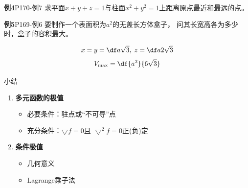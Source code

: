 \begin{frame}
	\linespread{1.2}
	\begin{exampleblock}{{\bf 例4}\hfill P170-例7}
		求平面$x+y+z=1$与柱面$x^2+y^2=1$上距离原点最近和最远的点。\pause 
	\end{exampleblock}
	\begin{center}
	\end{center}
\end{frame}

\begin{frame}
	\linespread{1.2}
	\begin{exampleblock}{{\bf 例5}\hfill P169-例6}
		要制作一个表面积为$a^2$的无盖长方体盒子，
		问其长宽高各为多少时，盒子的容积最大。\pause 
	\end{exampleblock}
	\alert{
	$$x=y=\df a{\sqrt 3},\;z=\df a{2\sqrt3}$$
	$$V_{\max}=\df{a^2}{6\sqrt 3}$$
	}
\end{frame}

\begin{frame}[<+->]{小结}
	\linespread{1.5}
	\begin{enumerate}
	  \item {\bf 多元函数的极值}
	  \begin{itemize}
	    \item 必要条件：驻点或“不可导”点
	    \item 充分条件：$\bigtriangledown f=0$且
	    $\bigtriangledown^2 f=0$正(负)定
	  \end{itemize}
	  \item {\bf 条件极值}
	  \begin{itemize}
	    \item 几何意义
	    \item Lagrange乘子法
	  \end{itemize}
	\end{enumerate}
\end{frame}

